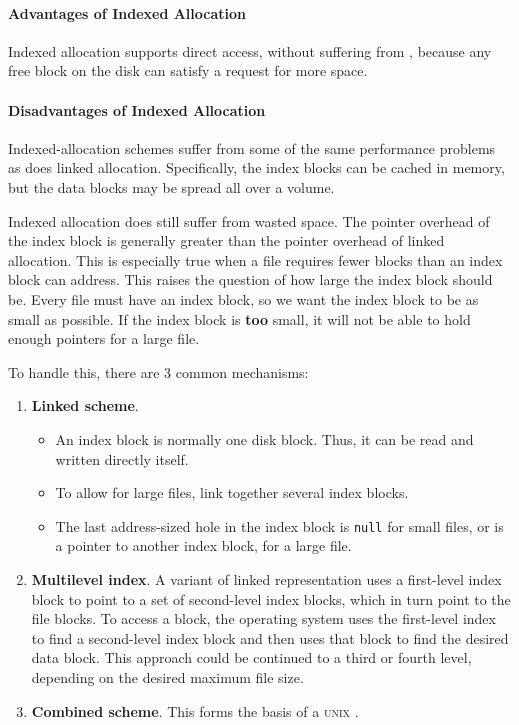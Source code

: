 \paragraph{Advantages of Indexed Allocation}\label{par:Indexed_File_Allocation_Advantages}
Indexed allocation supports direct access, without suffering from , because any free block on the disk can satisfy a request for more space.

\paragraph{Disadvantages of Indexed Allocation}\label{par:Indexed_File_Allocation_Disadvantages}
Indexed-allocation schemes suffer from some of the same performance problems as does linked allocation.
Specifically, the index blocks can be cached in memory, but the data blocks may be spread all over a volume.

Indexed allocation does still suffer from wasted space.
The pointer overhead of the index block is generally greater than the pointer overhead of linked allocation.
This is especially true when a file requires fewer blocks than an index block can address.
This raises the question of how large the index block should be.
Every file must have an index block, so we want the index block to be as small as possible.
If the index block is \textbf{too} small, it will not be able to hold enough pointers for a large file.

To handle this, there are 3 common mechanisms:
\begin{enumerate}[noitemsep]
\item \textbf{Linked scheme}.
  \begin{itemize}[noitemsep]
  \item An index block is normally one disk block.
    Thus, it can be read and written directly itself.
  \item To allow for large files, link together several index blocks.
  \item The last address-sized hole in the index block is \texttt{null} for small files, or is a pointer to another index block, for a large file.
\end{itemize}

\item \textbf{Multilevel index}.
  A variant of linked representation uses a first-level index
block to point to a set of second-level index blocks, which in turn point to
the file blocks. To access a block, the operating system uses the first-level
index to find a second-level index block and then uses that block to find the
desired data block. This approach could be continued to a third or fourth
level, depending on the desired maximum file size.

\item \textbf{Combined scheme}.
  This forms the basis of a \textsc{unix} .
\end{enumerate}

